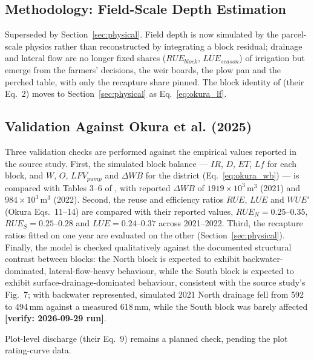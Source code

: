 \documentclass{article}
\newcommand{\verify}[1]{{\color{orange!85!black}\textbf{[verify: #1]}}}
\begin{document}
\subsection{Methodology: Field-Scale Depth Estimation}
\label{sec:depth-methodology}
\begin{removed}
Superseded by Section~\ref{sec:physical}. Field depth is now simulated by the parcel-scale physics rather than reconstructed by integrating a block residual; drainage and lateral flow are no longer fixed shares ($RUE_{block}$, $LUE_{season}$) of irrigation but emerge from the farmers' decisions, the weir boards, the plow pan and the perched table, with only the recapture share pinned. The block identity of \cite{Okura2025WaterBalance} (their Eq.~2) moves to Section~\ref{sec:physical} as Eq.~\ref{eq:okura_lf}.
\end{removed}

\subsection{Validation Against Okura et al. (2025)}
\label{sec:validation}
\begin{changed}
Three validation checks are performed against the empirical values reported in the source study. First, the simulated block balance --- $IR$, $D$, $ET$, $Lf$ for each block, and $W$, $O$, $LFV_{pump}$ and $\Delta WB$ for the district (Eq.~\ref{eq:okura_wb}) --- is compared with Tables 3--6 of \cite{Okura2025WaterBalance}, with reported $\Delta WB$ of $1919\times10^3$\,m$^3$ (2021) and $984\times10^3$\,m$^3$ (2022). Second, the reuse and efficiency ratios $RUE$, $LUE$ and $WUE'$ (Okura Eqs.~11--14) are compared with their reported values, $RUE_N = 0.25$--$0.35$, $RUE_S = 0.25$--$0.28$ and $LUE = 0.24$--$0.37$ across 2021--2022. Third, the recapture ratios fitted on one year are evaluated on the other (Section~\ref{sec:physical}). Finally, the model is checked qualitatively against the documented structural contrast between blocks: the North block is expected to exhibit backwater-dominated, lateral-flow-heavy behaviour, while the South block is expected to exhibit surface-drainage-dominated behaviour, consistent with the source study's Fig.~7; with backwater represented, simulated 2021 North drainage fell from 592 to 494\,mm against a measured 618\,mm, while the South block was barely affected \verify{2026-09-29 run}.

Plot-level discharge (their Eq.~9) remains a planned check, pending the plot rating-curve data.
\end{changed}
\end{document}
